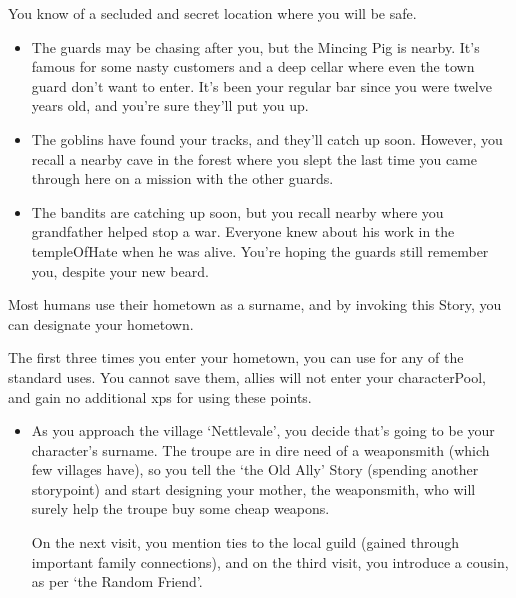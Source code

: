 \begin{multicols}{2}
You know of a secluded and secret location where you will be safe.

\begin{itemize}
  \item
  The guards may be chasing after you, but the Mincing Pig is nearby.  It's famous for some nasty customers and a deep cellar where even the town guard don't want to enter.
  It's been your regular bar since you were twelve years old, and you're sure they'll put you up.
  \item
  The goblins have found your tracks, and they'll catch up soon.
  However, you recall a nearby cave in the forest where you slept the last time you came through here on a mission with the other guards.
  \item
  The bandits are catching up soon, but you recall  nearby where you grandfather helped stop a war.
  Everyone knew about his work in the \gls{templeOfHate} when he was alive.
  You're hoping the guards still remember you, despite your new beard.
\end{itemize}

Most humans use their hometown as a surname, and by invoking this Story, you can designate your hometown.

The first three times you enter your hometown, you can use  for any of the standard uses.
You cannot save them, allies will not enter your \gls{characterPool}, and gain no additional \glspl{xp} for using these points.

\begin{itemize}
  \item
  As you approach the \gls{village} `Nettlevale', you decide that's going to be your character's surname.
  The troupe are in dire need of a weaponsmith (which few \glspl{village} have), so you tell the `the Old Ally' Story (spending another \gls{storypoint}) and start designing your mother, the weaponsmith, who will surely help the troupe buy some cheap weapons.

  On the next visit, you mention ties to the local guild (gained through important family connections), and on the third visit, you introduce a cousin, as per `the Random Friend'.
\end{itemize}

\end{multicols}
